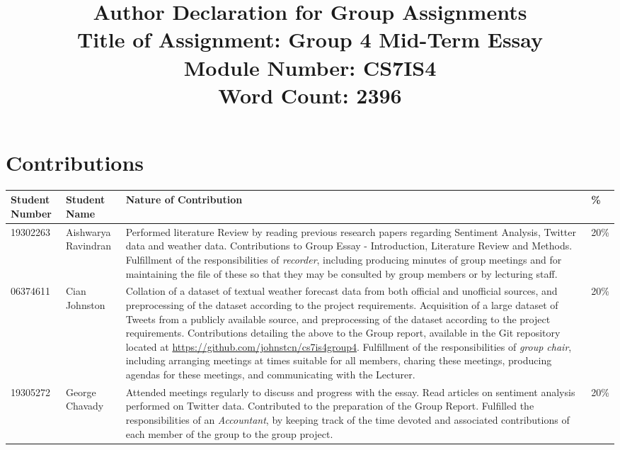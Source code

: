 \documentclass[a4paper,10pt]{article}
\begin{document}
\title{
    Author Declaration for Group Assignments \\
    \small Title of Assignment: Group 4 Mid-Term Essay \\
    \small Module Number: CS7IS4 \\
    \small Word Count: 2396
}
\author{}

\maketitle
\section{Contributions}
\begin{tabular}{ | p{2cm} | p{2cm} | p{10cm} | l | }
\hline
Student Number & Student Name & Nature of Contribution & \% \\ \hline
19302263 & Aishwarya Ravindran & Performed literature Review by reading previous research papers regarding Sentiment Analysis, Twitter data and weather data. Contributions to Group Essay - Introduction, Literature Review and Methods. Fulfillment of the responsibilities of \textit{recorder}, including producing minutes of group meetings and for maintaining the file of these so that they may be consulted by group members or by lecturing staff. & 20\% \\ \hline
06374611 & Cian Johnston & Collation of a dataset of textual weather forecast data from both official and unofficial sources, and preprocessing of the dataset according to the project requirements. Acquisition of a large dataset of Tweets from a publicly available source, and preprocessing of the dataset according to the project requirements. Contributions detailing the above to the Group report, available in the Git repository located at \url{https://github.com/johnstcn/cs7is4group4}. Fulfillment of the responsibilities of \textit{group chair}, including arranging meetings at times suitable for all members, charing these meetings, producing agendas for these meetings, and communicating with the Lecturer.  & 20\% \\ \hline
19305272 & George Chavady & Attended meetings regularly to discuss and progress with the essay. Read articles on sentiment analysis performed on Twitter data. Contributed to the preparation of the Group Report. Fulfilled the responsibilities of an \textit{Accountant}, by keeping track of the time devoted and associated contributions of each member of the group to the group project. & 20\% \\ \hline

\end{tabular}
\end{document}
